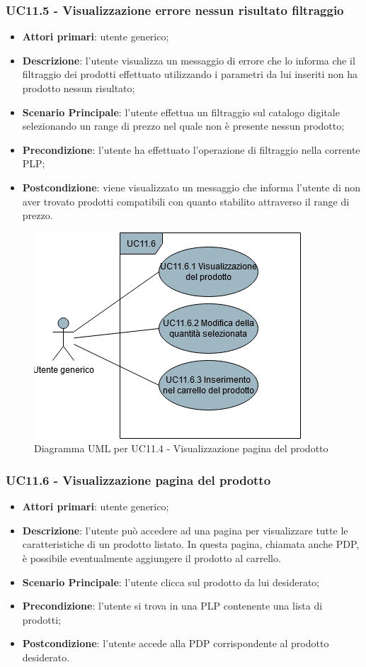 \subsubsection{UC11.5 - Visualizzazione errore nessun risultato filtraggio}
\begin{itemize}
\item \textbf{Attori primari}: utente generico;
\item \textbf{Descrizione}: l'utente visualizza un messaggio di errore che lo informa che il filtraggio dei prodotti effettuato utilizzando i parametri da lui inseriti non ha prodotto nessun risultato;
\item \textbf{Scenario Principale}: l'utente effettua un filtraggio sul catalogo digitale selezionando un range di prezzo nel quale non è presente nessun prodotto;
\item \textbf{Precondizione}: l'utente ha effettuato l'operazione di filtraggio nella corrente PLP;
\item \textbf{Postcondizione}: viene visualizzato un messaggio che informa l'utente di non aver trovato prodotti compatibili con quanto stabilito attraverso il range di prezzo.
\end{itemize}
\begin{figure}[H]
\centering
\includegraphics[scale=0.6]{res/UseCase/Immagini/VisualizzazionePaginaProdotto}
\caption{Diagramma UML per UC11.4 - Visualizzazione pagina del prodotto}
\end{figure}
\subsubsection{UC11.6 - Visualizzazione pagina del prodotto}
\begin{itemize}
\item \textbf{Attori primari}: utente generico;
\item \textbf{Descrizione}: l'utente può accedere ad una pagina per visualizzare tutte le caratteristiche di un prodotto listato. In questa pagina, chiamata anche PDP, è possibile eventualmente aggiungere il prodotto al carrello.
\item \textbf{Scenario Principale}: l'utente clicca sul prodotto da lui desiderato;
\item \textbf{Precondizione}: l'utente si trova in una PLP contenente una lista di prodotti;
\item \textbf{Postcondizione}: l'utente accede alla PDP corrispondente al prodotto desiderato.
\end{itemize}